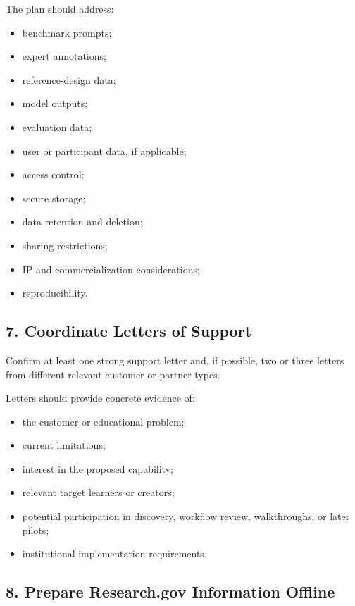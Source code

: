 \documentclass[11pt,letterpaper]{article}
\begin{document}
The plan should address:

\begin{itemize}[leftmargin=0.25in]
    \item benchmark prompts;
    \item expert annotations;
    \item reference-design data;
    \item model outputs;
    \item evaluation data;
    \item user or participant data, if applicable;
    \item access control;
    \item secure storage;
    \item data retention and deletion;
    \item sharing restrictions;
    \item IP and commercialization considerations;
    \item reproducibility.
\end{itemize}

\subsection{7. Coordinate Letters of Support}

Confirm at least one strong support letter and, if possible, two or three
letters from different relevant customer or partner types.

Letters should provide concrete evidence of:

\begin{itemize}[leftmargin=0.25in]
    \item the customer or educational problem;
    \item current limitations;
    \item interest in the proposed capability;
    \item relevant target learners or creators;
    \item potential participation in discovery, workflow review, walkthroughs,
    or later pilots;
    \item institutional implementation requirements.
\end{itemize}

\subsection{8. Prepare Research.gov Information Offline}
\end{document}
